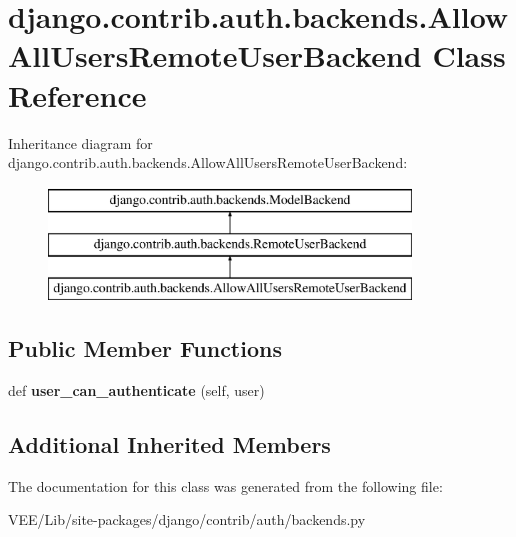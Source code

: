 \hypertarget{classdjango_1_1contrib_1_1auth_1_1backends_1_1_allow_all_users_remote_user_backend}{}\section{django.\+contrib.\+auth.\+backends.\+Allow\+All\+Users\+Remote\+User\+Backend Class Reference}
\label{classdjango_1_1contrib_1_1auth_1_1backends_1_1_allow_all_users_remote_user_backend}
Inheritance diagram for django.\+contrib.\+auth.\+backends.\+Allow\+All\+Users\+Remote\+User\+Backend\+:\begin{figure}[H]
\begin{center}
\leavevmode
\includegraphics[height=3.000000cm]{classdjango_1_1contrib_1_1auth_1_1backends_1_1_allow_all_users_remote_user_backend}
\end{center}
\end{figure}
\subsection*{Public Member Functions}
\begin{DoxyCompactItemize}
\item 
\mbox{\label{classdjango_1_1contrib_1_1auth_1_1backends_1_1_allow_all_users_remote_user_backend_a70dbde0982a4734d89365b229c41a9da}} 
def {\bfseries user\+\_\+can\+\_\+authenticate} (self, user)
\end{DoxyCompactItemize}
\subsection*{Additional Inherited Members}


The documentation for this class was generated from the following file\+:\begin{DoxyCompactItemize}
\item 
V\+E\+E/\+Lib/site-\/packages/django/contrib/auth/backends.\+py\end{DoxyCompactItemize}
